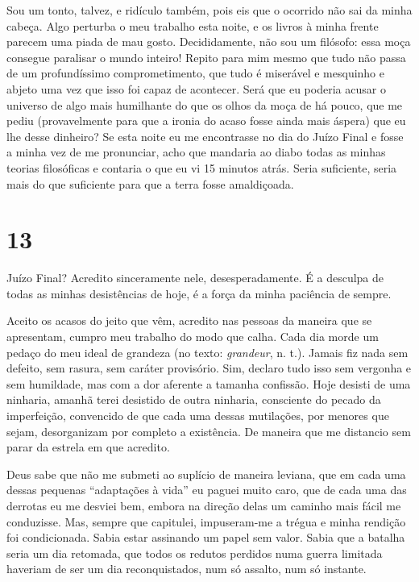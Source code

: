 Sou um tonto, talvez, e ridículo também, pois eis que o ocorrido não sai
da minha cabeça. Algo perturba o meu trabalho esta noite, e os livros à
minha frente parecem uma piada de mau gosto. Decididamente, não sou um
filósofo: essa moça consegue paralisar o mundo inteiro! Repito para mim
mesmo que tudo não passa de um profundíssimo comprometimento, que tudo é
miserável e mesquinho e abjeto uma vez que isso foi capaz de acontecer.
Será que eu poderia acusar o universo de algo mais humilhante do que os
olhos da moça de há pouco, que me pediu (provavelmente para que a ironia
do acaso fosse ainda mais áspera) que eu lhe desse dinheiro? Se esta
noite eu me encontrasse no dia do Juízo Final e fosse a minha vez de me
pronunciar, acho que mandaria ao diabo todas as minhas teorias
filosóficas e contaria o que eu vi 15 minutos atrás. Seria suficiente,
seria mais do que suficiente para que a terra fosse amaldiçoada.

\section{13}

Juízo Final? Acredito sinceramente nele, desesperadamente. É a desculpa
de todas as minhas desistências de hoje, é a força da minha paciência de
sempre.

Aceito os acasos do jeito que vêm, acredito nas pessoas da maneira que
se apresentam, cumpro meu trabalho do modo que calha. Cada dia morde um
pedaço do meu ideal de grandeza (no texto: \emph{grandeur}, n. t.).
Jamais fiz nada sem defeito, sem rasura, sem caráter provisório. Sim,
declaro tudo isso sem vergonha e sem humildade, mas com a dor aferente a
tamanha confissão. Hoje desisti de uma ninharia, amanhã terei desistido
de outra ninharia, consciente do pecado da imperfeição, convencido de
que cada uma dessas mutilações, por menores que sejam, desorganizam por
completo a existência. De maneira que me distancio sem parar da estrela
em que acredito.

Deus sabe que não me submeti ao suplício de maneira leviana, que em cada
uma dessas pequenas ``adaptações à vida'' eu paguei muito caro, que de
cada uma das derrotas eu me desviei bem, embora na direção delas um
caminho mais fácil me conduzisse. Mas, sempre que capitulei,
impuseram-me a trégua e minha rendição foi condicionada. Sabia estar
assinando um papel sem valor. Sabia que a batalha seria um dia retomada,
que todos os redutos perdidos numa guerra limitada haveriam de ser um
dia reconquistados, num só assalto, num só instante.

